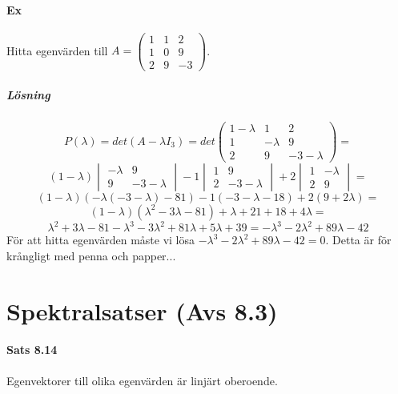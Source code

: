 \paragraph{Ex} Hitta egenvärden till $A=\begin{pmatrix}1&1&2\\1&0&9\\2&9&-3\end{pmatrix}$.
\subparagraph{Lösning} 
\begin{equation*}
    P(\lambda)=det(A-\lambda I_3)=
det\begin{pmatrix}
    1-\lambda&1&2\\
    1&-\lambda&9\\
    2&9&-3-\lambda
\end{pmatrix}=
\end{equation*}
\begin{equation*}
    (1-\lambda)\begin{vmatrix}
        -\lambda&9\\9&-3-\lambda
    \end{vmatrix}-
    1\begin{vmatrix}
        1&9\\2&-3-\lambda
    \end{vmatrix}+
    2\begin{vmatrix}
        1&-\lambda\\2&9
    \end{vmatrix}=
\end{equation*}
\begin{equation*}
    (1-\lambda)(-\lambda(-3-\lambda)-81)-1(-3-\lambda-18)+2(9+2\lambda)=
\end{equation*}
\begin{equation*}
    (1-\lambda)(\lambda^2-3\lambda-81)+\lambda+21+18+4\lambda=
\end{equation*}
\begin{equation*}
    \lambda^2+3\lambda-81-\lambda^3-3\lambda^2+81\lambda+5\lambda+39=-\lambda^3-2\lambda^2+89\lambda-42
\end{equation*}
För att hitta egenvärden måste vi lösa $-\lambda^3-2\lambda^2+89\lambda-42=0$.
Detta är för krångligt med penna och papper...

\clearpage
\section{Spektralsatser (Avs 8.3)}
\paragraph{Sats 8.14} Egenvektorer till olika egenvärden är linjärt oberoende.


